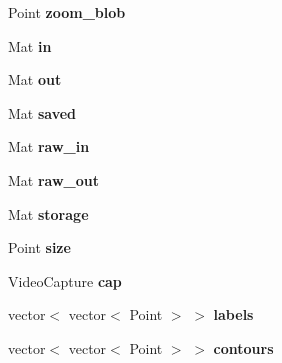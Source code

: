 \begin{DoxyCompactItemize}
\item 
Point {\bfseries zoom\+\_\+blob}\hypertarget{classcalibration_af15b11ca11726a106ce3581d28ae2fe2}{}\label{classcalibration_af15b11ca11726a106ce3581d28ae2fe2}

\item 
Mat {\bfseries in}\hypertarget{classcalibration_a5381436b7a018d1bd969198a6ee84309}{}\label{classcalibration_a5381436b7a018d1bd969198a6ee84309}

\item 
Mat {\bfseries out}\hypertarget{classcalibration_a683520c2e997f8acf95d0c3cad6290b9}{}\label{classcalibration_a683520c2e997f8acf95d0c3cad6290b9}

\item 
Mat {\bfseries saved}\hypertarget{classcalibration_a992ee8c844d808217befd60c10c02980}{}\label{classcalibration_a992ee8c844d808217befd60c10c02980}

\item 
Mat {\bfseries raw\+\_\+in}\hypertarget{classcalibration_aa72b48a8e046d6409517e418335fb45b}{}\label{classcalibration_aa72b48a8e046d6409517e418335fb45b}

\item 
Mat {\bfseries raw\+\_\+out}\hypertarget{classcalibration_af12fa7781d0b718f408b6cae7a25704e}{}\label{classcalibration_af12fa7781d0b718f408b6cae7a25704e}

\item 
Mat {\bfseries storage}\hypertarget{classcalibration_a6eab74dcffae5bd8449df9b79b2d8ebc}{}\label{classcalibration_a6eab74dcffae5bd8449df9b79b2d8ebc}

\item 
Point {\bfseries size}\hypertarget{classcalibration_a10327f11f7951f4282ada6c354e62522}{}\label{classcalibration_a10327f11f7951f4282ada6c354e62522}

\item 
Video\+Capture {\bfseries cap}\hypertarget{classcalibration_a4fbb8e4cac6239dc7135963c0f500105}{}\label{classcalibration_a4fbb8e4cac6239dc7135963c0f500105}

\item 
vector$<$ vector$<$ Point $>$ $>$ {\bfseries labels}\hypertarget{classcalibration_ac1a1606070bf5b667f1e7a07e3e08d1d}{}\label{classcalibration_ac1a1606070bf5b667f1e7a07e3e08d1d}

\item 
vector$<$ vector$<$ Point $>$ $>$ {\bfseries contours}\hypertarget{classcalibration_a81c7edbfe89f8f1692193bc81309a55d}{}\label{classcalibration_a81c7edbfe89f8f1692193bc81309a55d}


\end{DoxyCompactItemize}
